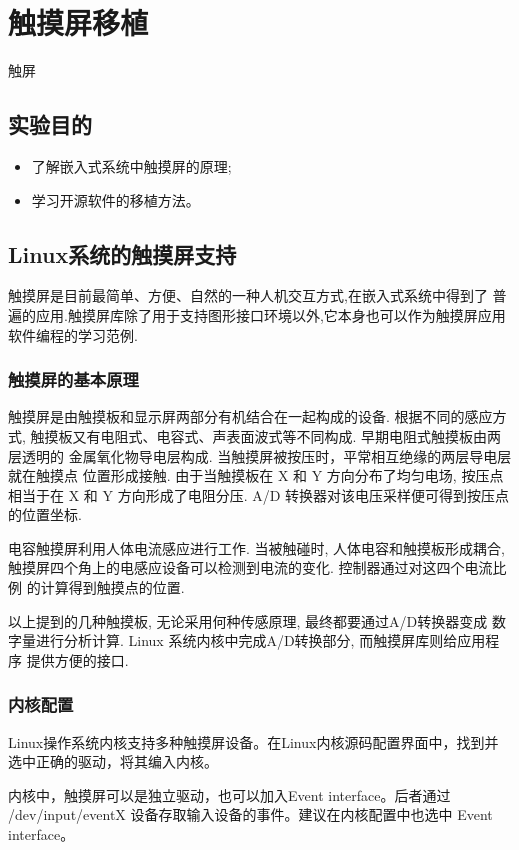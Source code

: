 \chapter{触摸屏移植}{触屏}\label{ch-ts}

\section{实验目的}
\begin{itemize}\itemsep=-3pt
  \item 了解嵌入式系统中触摸屏的原理;
  \item 学习开源软件的移植方法。
\end{itemize}

\section{Linux系统的触摸屏支持}
	触摸屏是目前最简单、方便、自然的一种人机交互方式,在嵌入式系统中得到了
普遍的应用.触摸屏库除了用于支持图形接口环境以外,它本身也可以作为触摸屏应用
软件编程的学习范例.

\subsection{触摸屏的基本原理}
触摸屏是由触摸板和显示屏两部分有机结合在一起构成的设备. 根据不同的感应方式,
触摸板又有电阻式、电容式、声表面波式等不同构成. 早期电阻式触摸板由两层透明的
金属氧化物导电层构成. 当触摸屏被按压时，平常相互绝缘的两层导电层就在触摸点
位置形成接触. 由于当触摸板在 X 和 Y 方向分布了均匀电场, 按压点相当于在 X 和
Y 方向形成了电阻分压. A/D 转换器对该电压采样便可得到按压点的位置坐标.

电容触摸屏利用人体电流感应进行工作. 当被触碰时, 人体电容和触摸板形成耦合,
触摸屏四个角上的电感应设备可以检测到电流的变化. 控制器通过对这四个电流比例
的计算得到触摸点的位置.

以上提到的几种触摸板, 无论采用何种传感原理, 最终都要通过A/D转换器变成
数字量进行分析计算. Linux 系统内核中完成A/D转换部分, 而触摸屏库则给应用程序
提供方便的接口.

\subsection{内核配置}
	Linux操作系统内核支持多种触摸屏设备。在Linux内核源码配置界面中，找到并
选中正确的驱动，将其编入内核。

	内核中，触摸屏可以是独立驱动，也可以加入Event interface。后者通过
 /dev/input/eventX 设备存取输入设备的事件。建议在内核配置中也选中
 Event interface。


